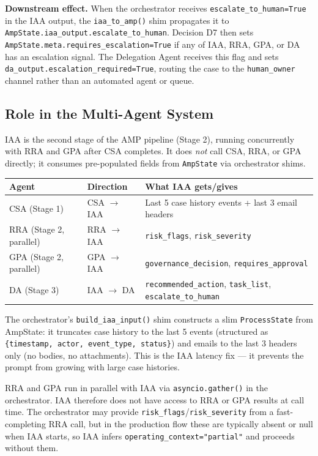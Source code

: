 \documentclass[12pt,a4paper]{article}
\begin{document}
\textbf{Downstream effect.} When the orchestrator receives
\texttt{escalate\_to\_human=True} in the IAA output, the \texttt{iaa\_to\_amp()} shim
propagates it to \texttt{AmpState.iaa\_output.escalate\_to\_human}. Decision D7
then sets \texttt{AmpState.meta.requires\_escalation=True} if any of IAA, RRA, GPA,
or DA has an escalation signal. The Delegation Agent receives this flag and sets
\texttt{da\_output.escalation\_required=True}, routing the case to the
\texttt{human\_owner} channel rather than an automated agent or queue.

\subsection{Role in the Multi-Agent System}

IAA is the second stage of the AMP pipeline (Stage 2), running concurrently with
RRA and GPA after CSA completes. It does \emph{not} call CSA, RRA, or GPA directly;
it consumes pre-populated fields from \texttt{AmpState} via orchestrator shims.

\begin{center}
\begin{tabular}{@{}lll@{}}
\toprule
\textbf{Agent} & \textbf{Direction} & \textbf{What IAA gets/gives} \\
\midrule
CSA (Stage 1) & CSA $\to$ IAA & Last 5 case history events + last 3 email headers \\
RRA (Stage 2, parallel) & RRA $\to$ IAA & \texttt{risk\_flags}, \texttt{risk\_severity} \\
GPA (Stage 2, parallel) & GPA $\to$ IAA & \texttt{governance\_decision}, \texttt{requires\_approval} \\
DA (Stage 3) & IAA $\to$ DA & \texttt{recommended\_action}, \texttt{task\_list}, \texttt{escalate\_to\_human} \\
\bottomrule
\end{tabular}
\end{center}

The orchestrator's \texttt{build\_iaa\_input()} shim constructs a slim \texttt{ProcessState}
from AmpState: it truncates case history to the last 5 events (structured as
\texttt{\{timestamp, actor, event\_type, status\}}) and emails to the last 3 headers
only (no bodies, no attachments). This is the IAA latency fix --- it prevents the
prompt from growing with large case histories.

RRA and GPA run in parallel with IAA via \texttt{asyncio.gather()} in the orchestrator.
IAA therefore does not have access to RRA or GPA results at call time. The orchestrator
may provide \texttt{risk\_flags}/\texttt{risk\_severity} from a fast-completing RRA
call, but in the production flow these are typically absent or null when IAA starts,
so IAA infers \texttt{operating\_context="partial"} and proceeds without them.
\end{document}
